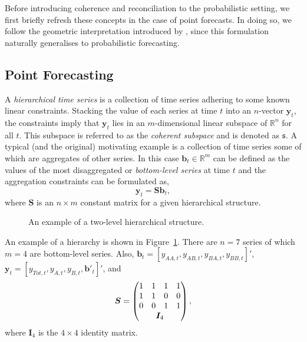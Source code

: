 \documentclass[11pt]{article}
\theoremstyle{definition}
\begin{document}
Before introducing coherence and reconciliation to the probabilistic setting, we first briefly refresh these concepts in the case of point forecasts. In doing so, we follow the geometric interpretation introduced by \cite{PanEtAl2020_Geometry}, since this formulation naturally generalises to probabilistic forecasting.

\subsection{Point Forecasting}\label{sec:PointForecasts}

A \emph{hierarchical time series} is a collection of time series adhering to some known linear constraints. Stacking the value of each series at time $t$ into an $n$-vector $\bm{y}_t$, the constraints imply that $\bm{y}_t$ lies in an $m$-dimensional linear subspace of $\mathbb{R}^n$ for all $t$. This subspace is referred to as the \emph{coherent subspace} and is denoted as $\mathfrak{s}$. A typical (and the original) motivating example is a collection of time series some of which are aggregates of other series. In this case $\bm{b}_t \in \mathbb{R}^m$ can be defined as the values of the most disaggregated or \emph{bottom-level series} at time $t$ and the aggregation constraints can be formulated as,
\begin{equation*}
\bm{y}_t = \bm{S}\bm{b}_t,
\end{equation*}
where $\bm{S}$ is an $n \times m$ constant matrix for a given hierarchical structure.

\begin{figure}[H]
	\begin{center}
		 
		 
		\qobitree
	\end{center}
	\caption{An example of a two-level hierarchical structure.}\label{fig:twoL-hier}
\end{figure}
An example of a hierarchy is shown in Figure~\ref{fig:twoL-hier}. There are $n=7$ series of which $m=4$ are bottom-level series. Also, $\bm{b}_t = [y_{AA,t}, y_{AB,t}, y_{BA,t}, y_{BB,t}]'$, $\bm{y}_t = [y_{Tot,t},y_{A,t}, y_{B,t},\bm{b}'_t]'$, and
\[
\bm{S} = \begin{pmatrix}
1 & 1 & 1 & 1 \\
1 & 1 & 0 & 0 \\
0 & 0 & 1 & 1 \\
& \multicolumn{2}{c}{\bm{I}_4} &
\end{pmatrix},
\]
where $\bm{I}_4$ is the $4\times 4$ identity matrix.
\end{document}
